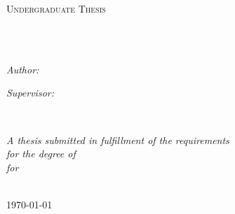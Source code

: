 \documentclass[
11pt, %
english, %
singlespacing, %
headsepline, %
]{MastersDoctoralThesis} %
\author{Dylan \textsc{Lathrum}} %
\begin{document}
\frontmatter %

\pagestyle{plain} %


\begin{titlepage}
	\begin{center}

		\vspace*{.06\textheight}
		{\scshape\LARGE \univname\par}\vspace{1.5cm} %
		\textsc{\Large Undergraduate Thesis}\\[0.5cm] %

		\HRule \\[0.4cm] %
		{\huge \bfseries \ttitle\par}\vspace{0.4cm} %
		\HRule \\[1.5cm] %

		\begin{minipage}[t]{0.4\textwidth}
			\begin{flushleft} \large
				\emph{Author:}\\
				\href{https://www.linkedin.com/in/dylanlathrum/}{\authorname} %
			\end{flushleft}
		\end{minipage}
		\begin{minipage}[t]{0.4\textwidth}
			\begin{flushright} \large
				\emph{Supervisor:} \\
				\href{https://isearch.asu.edu/profile/3180015}{\supname} %
			\end{flushright}
		\end{minipage}\\[3cm]

		\vfill

		\large \textit{A thesis submitted in fulfillment of the requirements\\ for the degree of \degreename}\\[0.3cm] %
		\textit{for}\\[0.4cm]
		\deptname\\[2cm] %

		\vfill

		{\large \today}\\[4cm] %

		\vfill
	\end{center}
\end{titlepage}
\end{document}
